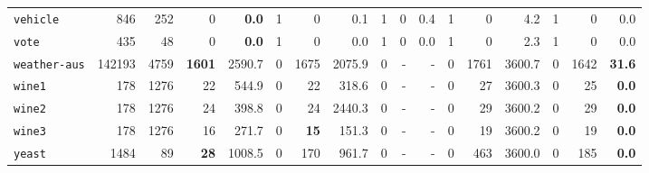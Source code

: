 \begin{tabular}{lccrrrrrrrrrrrrrr}
\texttt{vehicle} & \multicolumn{1}{r}{846} & \multicolumn{1}{r}{252}  & 0 & \textbf{0.0} & 1 & 0 & 0.1 & 1 & 0 & 0.4 & 1 & 0 & 4.2 & 1 & 0 & 0.0\\
\texttt{vote} & \multicolumn{1}{r}{435} & \multicolumn{1}{r}{48}  & 0 & \textbf{0.0} & 1 & 0 & 0.0 & 1 & 0 & 0.0 & 1 & 0 & 2.3 & 1 & 0 & 0.0\\
\texttt{weather-aus} & \multicolumn{1}{r}{142193} & \multicolumn{1}{r}{4759}  & \textbf{1601} & 2590.7 & 0 & 1675 & 2075.9 & 0 & - & - & 0 & 1761 & 3600.7 & 0 & 1642 & \textbf{31.6}\\
\texttt{wine1} & \multicolumn{1}{r}{178} & \multicolumn{1}{r}{1276}  & 22 & 544.9 & 0 & 22 & 318.6 & 0 & - & - & 0 & 27 & 3600.3 & 0 & 25 & \textbf{0.0}\\
\texttt{wine2} & \multicolumn{1}{r}{178} & \multicolumn{1}{r}{1276}  & 24 & 398.8 & 0 & 24 & 2440.3 & 0 & - & - & 0 & 29 & 3600.2 & 0 & 29 & \textbf{0.0}\\
\texttt{wine3} & \multicolumn{1}{r}{178} & \multicolumn{1}{r}{1276}  & 16 & 271.7 & 0 & \textbf{15} & 151.3 & 0 & - & - & 0 & 19 & 3600.2 & 0 & 19 & \textbf{0.0}\\
\texttt{yeast} & \multicolumn{1}{r}{1484} & \multicolumn{1}{r}{89}  & \textbf{28} & 1008.5 & 0 & 170 & 961.7 & 0 & - & - & 0 & 463 & 3600.0 & 0 & 185 & \textbf{0.0}\\
\bottomrule
\end{tabular}
